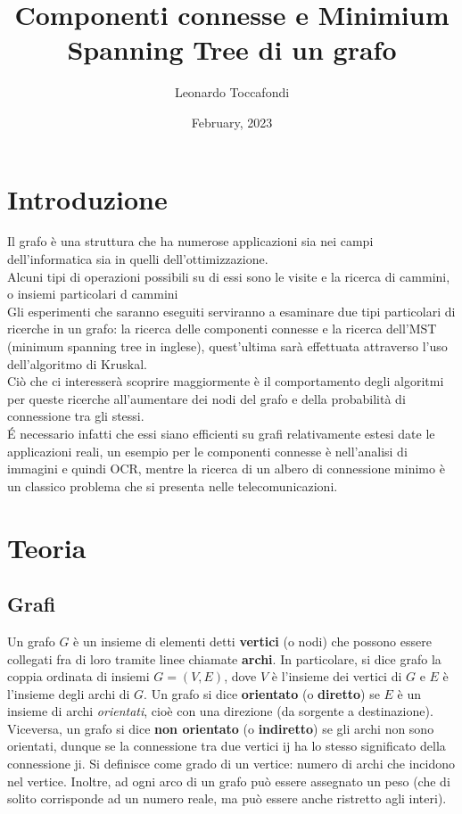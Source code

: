 \documentclass[
]{article}
\title{Componenti connesse e Minimium Spanning Tree di un grafo}
\author{Leonardo Toccafondi}
\date{February, 2023}
\begin{document}
\maketitle

\hypertarget{introduzione}{%
\section{Introduzione}\label{introduzione}}

Il grafo è una struttura che ha numerose applicazioni sia nei campi
dell'informatica sia in quelli dell'ottimizzazione.\\
Alcuni tipi di operazioni possibili su di essi sono le visite e la
ricerca di cammini, o insiemi particolari d cammini\\
Gli esperimenti che saranno eseguiti serviranno a esaminare due tipi
particolari di ricerche in un grafo: la ricerca delle componenti
connesse e la ricerca dell'MST (minimum spanning tree in inglese),
quest'ultima sarà effettuata attraverso l'uso dell'algoritmo di
Kruskal.\\
Ciò che ci interesserà scoprire maggiormente è il comportamento degli
algoritmi per queste ricerche all'aumentare dei nodi del grafo e della
probabilità di connessione tra gli stessi.\\
É necessario infatti che essi siano efficienti su grafi relativamente
estesi date le applicazioni reali, un esempio per le componenti connesse
è nell'analisi di immagini e quindi OCR, mentre la ricerca di un albero
di connessione minimo è un classico problema che si presenta nelle
telecomunicazioni.

\hypertarget{teoria}{%
\section{Teoria}\label{teoria}}

\hypertarget{grafi}{%
\subsection{Grafi}\label{grafi}}

Un grafo \(G\) è un insieme di elementi detti \textbf{vertici} (o nodi)
che possono essere collegati fra di loro tramite linee chiamate
\textbf{archi}. In particolare, si dice grafo la coppia ordinata di
insiemi \(G = (V, E)\), dove \(V\) è l'insieme dei vertici di \(G\) e
\(E\) è l'insieme degli archi di \(G\). Un grafo si dice
\textbf{orientato} (o \textbf{diretto}) se \(E\) è un insieme di archi
\emph{orientati}, cioè con una direzione (da sorgente a destinazione).
Viceversa, un grafo si dice \textbf{non orientato} (o
\textbf{indiretto}) se gli archi non sono orientati, dunque se la
connessione tra due vertici ij ha lo stesso significato della
connessione ji. Si definisce come grado di un vertice: numero di archi
che incidono nel vertice. Inoltre, ad ogni arco di un grafo può essere
assegnato un peso (che di solito corrisponde ad un numero reale, ma può
essere anche ristretto agli interi).
\end{document}
